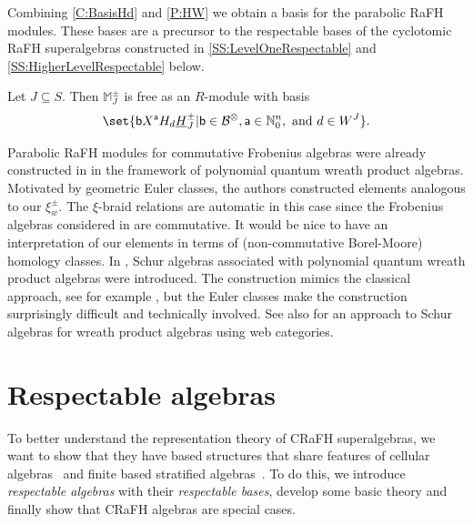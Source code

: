 \documentclass[a4paper,11pt]{amsart}
\newcommand\cB{\mathcal{B}}
\newcommand\cBo{\cB^{\otimes}}
\numberwithin{equation}{subsection}
\theoremstyle{definition}
\theoremstyle{theorem}
\theoremstyle{remark}
\newcommand\MJ{\mathbb{M}}
\newcommand\HJpm{\underline{H}^\pm}
\newcommand\Sym{W}
\newcommand\ba{\mathsf{a}}
\newcommand\bb{\mathsf{b}}
\newcommand\N{\mathbb{N}}
\begin{document}
 Combining \autoref{C:BasisHd} and \autoref{P:HW} we obtain a basis for
 the parabolic RaFH modules. These bases are a precursor to the
 respectable bases of the cyclotomic RaFH superalgebras constructed in
 \autoref{SS:LevelOneRespectable} and
 \autoref{SS:HigherLevelRespectable} below.


 \begin{Corollary}\label{C:MJBasis}
    Let $J\subseteq S$.  Then $\MJ^\pm_{J}$
      is free as an $R$-module with
     basis \[\set{\bb X^\ba  H_d\HJpm_J|\bb\in\cBo, \ba\in\N^n_{0}, \text{ and }d\in\Sym^J }.\]
 \end{Corollary}

 \begin{Remark}\label{R:LaiMinets}
   Parabolic RaFH modules  for commutative Frobenius algebras were already constructed in \cite{LaiMinets} in the framework of polynomial quantum wreath product algebras.
Motivated by geometric Euler classes, the authors constructed elements
analogous to our $\xi^\pm_w$. The $\xi$-braid relations are automatic in
this case since the Frobenius algebras considered in \cite{LaiMinets} are
commutative. It would be nice to have an interpretation of our elements in
terms of (non-commutative Borel-Moore) homology classes.  In
\cite{LaiMinets}, Schur algebras associated with polynomial quantum
wreath product algebras were introduced. The construction mimics the
classical approach, see for example \cite{Mathas:ULect}, but the Euler classes make the construction surprisingly difficult and technically involved.  See also \cite{Muthandco} for an approach to Schur algebras for wreath product algebras using web categories.
\end{Remark}


\section{Respectable algebras}
  To better understand the representation theory of CRaFH superalgebras, we want to show
  that they  have based structures that share features of
  cellular algebras~\cite{GrahamLehrer:Cellular} and finite based
  stratified algebras~\cite{BrundanStroppel:Semiinfinite}. To do
  this, we introduce \emph{respectable algebras} with their \emph{respectable bases},
  develop some basic theory and finally show that CRaFH algebras are special cases.
\end{document}
